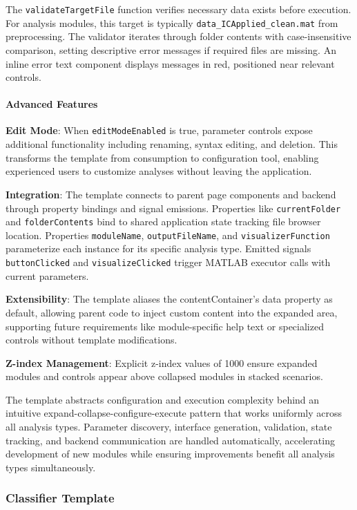 \documentclass[12pt]{report}
\begin{document}
The \verb|validateTargetFile| function verifies necessary data exists before execution. For analysis modules, this target is typically \verb|data_ICApplied_clean.mat| from preprocessing. The validator iterates through folder contents with case-insensitive comparison, setting descriptive error messages if required files are missing. An inline error text component displays messages in red, positioned near relevant controls.

\paragraph{Advanced Features}\mbox{}

\textbf{Edit Mode}: When \verb|editModeEnabled| is true, parameter controls expose additional functionality including renaming, syntax editing, and deletion. This transforms the template from consumption to configuration tool, enabling experienced users to customize analyses without leaving the application.

\textbf{Integration}: The template connects to parent page components and backend through property bindings and signal emissions. Properties like \verb|currentFolder| and \verb|folderContents| bind to shared application state tracking file browser location. Properties \verb|moduleName|, \verb|outputFileName|, and \verb|visualizerFunction| parameterize each instance for its specific analysis type. Emitted signals \verb|buttonClicked| and \verb|visualizeClicked| trigger MATLAB executor calls with current parameters.

\textbf{Extensibility}: The template aliases the contentContainer's data property as default, allowing parent code to inject custom content into the expanded area, supporting future requirements like module-specific help text or specialized controls without template modifications.

\textbf{Z-index Management}: Explicit z-index values of 1000 ensure expanded modules and controls appear above collapsed modules in stacked scenarios.

The template abstracts configuration and execution complexity behind an intuitive expand-collapse-configure-execute pattern that works uniformly across all analysis types. Parameter discovery, interface generation, validation, state tracking, and backend communication are handled automatically, accelerating development of new modules while ensuring improvements benefit all analysis types simultaneously.


\subsubsection{Classifier Template}
\end{document}
